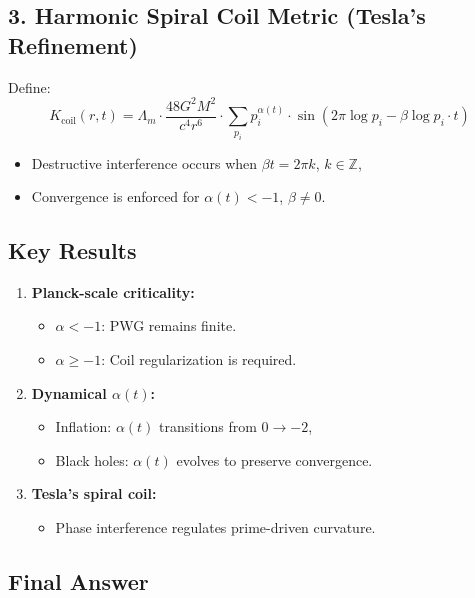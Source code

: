 \documentclass{article}
\theoremstyle{plain}
\theoremstyle{claimstyle}
\begin{document}
\subsection*{3. Harmonic Spiral Coil Metric (Tesla’s Refinement)}

Define:
\[
K_{\text{coil}}(r, t) = \Lambda_m \cdot \frac{48 G^2 M^2}{c^4 r^6} \cdot \sum_{p_i} p_i^{\alpha(t)} \cdot \sin\left( 2\pi \log p_i - \beta \log p_i \cdot t \right)
\]

\begin{itemize}
    \item Destructive interference occurs when \( \beta t = 2\pi k \), \( k \in \mathbb{Z} \),
    \item Convergence is enforced for \( \alpha(t) < -1 \), \( \beta \neq 0 \).
\end{itemize}

\subsection*{Key Results}

\begin{enumerate}
    \item \textbf{Planck-scale criticality:}  
    \begin{itemize}
        \item \( \alpha < -1 \): PWG remains finite.  
        \item \( \alpha \geq -1 \): Coil regularization is required.
    \end{itemize}

    \item \textbf{Dynamical \( \alpha(t) \):}  
    \begin{itemize}
        \item Inflation: \( \alpha(t) \) transitions from \( 0 \to -2 \),
        \item Black holes: \( \alpha(t) \) evolves to preserve convergence.
    \end{itemize}

    \item \textbf{Tesla’s spiral coil:}  
    \begin{itemize}
        \item Phase interference regulates prime-driven curvature.
    \end{itemize}
\end{enumerate}

\subsection*{Final Answer}
\end{document}

